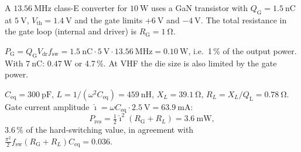 

A $\SI{13.56}{\mega\hertz}$ class-E converter for $\SI{10}{\watt}$ uses a GaN transistor with $Q_\mathrm{G}=\SI{1.5}{\nano\coulomb}$ at $\SI{5}{\volt}$, $V_\mathrm{th}=\SI{1.4}{\volt}$ and the gate limits $+\SI{6}{\volt}$ and $-\SI{4}{\volt}$. The total resistance in the gate loop (internal and driver) is $R_\mathrm{G}=\SI{1}{\ohm}$.


\begin{solutionblock}
	$P_\mathrm{G}=Q_\mathrm{G}V_\mathrm{dr}f_\mathrm{sw}=\SI{1.5}{\nano\coulomb}\cdot\SI{5}{\volt}\cdot\SI{13.56}{\mega\hertz}=\SI{0.10}{\watt}$, i.e.\ 1\,\% of the output power. With $\SI{7}{\nano\coulomb}$: $\SI{0.47}{\watt}$ or 4.7\,\%. At VHF the die size is also limited by the gate power.
\end{solutionblock}


\begin{solutionblock}
	$C_\mathrm{eq}=\SI{300}{\pico\farad}$, $L=1/(\omega^2C_\mathrm{eq})=\SI{459}{\nano\henry}$, $X_L=\SI{39.1}{\ohm}$, $R_L=X_L/Q_\mathrm{L}=\SI{0.78}{\ohm}$. Gate current amplitude $\hat{\imath}=\omega C_\mathrm{eq}\cdot\SI{2.5}{\volt}=\SI{63.9}{\milli\ampere}$:
	\begin{equation}
		P_\mathrm{res}=\tfrac12\hat{\imath}^2(R_\mathrm{G}+R_L)=\SI{3.6}{\milli\watt},
	\end{equation}
	3.6\,\% of the hard-switching value, in agreement with $\frac{\pi^2}{2}f_\mathrm{sw}(R_\mathrm{G}+R_L)C_\mathrm{eq}=0.036$.
\end{solutionblock}


